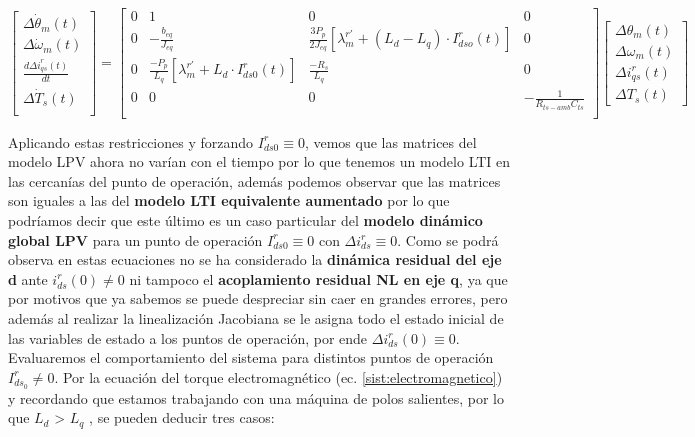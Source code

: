 \documentclass[10pt]{article}
\begin{document}
\begin{enumerate}
	\begin{equation}
		\begin{bmatrix}
			\Delta \dot{\theta}_{m}(t)\\
			\Delta \dot{\omega}_{m}(t)
			\\ 
			\frac{d \Delta i^{r}_{qs}(t)}{dt}\\
			\Delta \dot{T}_{s}(t)\\
		\end{bmatrix}
		=
		\begin{bmatrix}
			0 & 1 &0 &0  \\ 
			0 & -\frac{b_{eq}}{J_{eq}} & \frac{3 P_{p}}{2 J_{eq}}[ \lambda^{r'}_{m}+\left ( L_{d}-L_{q} \right )\cdot I_{dso}^{r} (t)]&0 \\ 
			0  & \frac{- P_{p} }{ L_{q}} [\lambda^{r'}_{m}+L_{d}\cdot I^{r}_{ds0}(t)]& \frac{-R_{s}}{L_{q}}&0\\
			0 & 0 & 0 & -\frac{1}{R_{ts-amb} C_{ts}}\\
		\end{bmatrix} 
	\begin{bmatrix}
	\Delta \theta_{m}(t)\\
	\Delta \omega_{m}(t)
	\\ 
	\Delta i^{r}_{qs}(t)\\
	\Delta T_{s}(t)
	\end{bmatrix}
	\label{eq:2.1.2.f.1}
	\end{equation}
	
	Aplicando estas restricciones y forzando $I^{r}_{ds0} \equiv 0$, vemos que las matrices del modelo LPV ahora no varían con el tiempo por lo que tenemos un modelo LTI en las cercanías del punto de operación, además podemos observar que las matrices son iguales a las del \textbf{modelo LTI equivalente aumentado} por lo que podríamos decir que este último es un caso particular  del \textbf{modelo dinámico global LPV} para un punto de operación $I^{r}_{ds0} \equiv 0$ con $\Delta i^{r}_{ds} \equiv 0$.
	Como se podrá observa en estas ecuaciones no se ha considerado la \textbf{dinámica residual del eje d} ante $i^{r}_{ds}(0)\neq 0$ ni tampoco el \textbf{acoplamiento residual NL en eje q}, ya que por motivos que ya sabemos se puede despreciar sin caer en grandes errores, pero además al realizar la linealización Jacobiana se le asigna todo el estado inicial de las variables de estado a los puntos de operación, por ende $\Delta i^{r}_{ds}(0) \equiv 0$.\\
	Evaluaremos el comportamiento del sistema para distintos puntos de operación $I^{r}_{ds_{0}}\neq 0$.
	Por la ecuación del torque electromagnético (ec. \ref{sist:electromagnetico}) y recordando que estamos trabajando con una máquina de polos salientes, por lo que $L_{d}$ > $L_{q}$ , se pueden deducir tres casos:
	

\end{enumerate}
\end{document}
